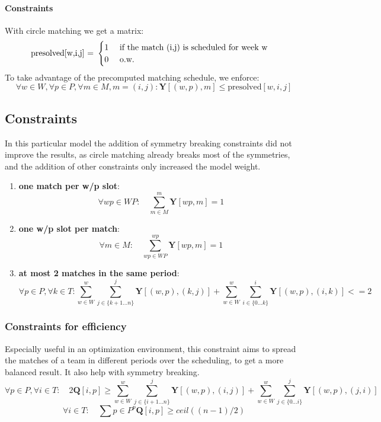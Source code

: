 \paragraph{Constraints}
With circle matching we get a matrix:
\[
\text{presolved[w,i,j] = }
\begin{cases}
    \text{1 \quad if the match (i,j) is scheduled for week w}\\
    \text{0 \quad o.w.}
\end{cases}
\]
To take advantage of the precomputed matching schedule, we enforce:
\[\forall w \in W, \forall p \in P, \forall m \in M, m = (i,j): \textbf{Y}[(w,p),m] \leq \text{presolved}[w,i,j]\]


\subsection{Constraints}
In this particular model the addition of symmetry breaking constraints did not improve the results, as circle matching already breaks most of the symmetries, and the addition of other constraints only increased the model weight.

\begin{enumerate}
\item \textbf{one match per w/p slot}: 
\[\forall wp \in WP: \quad\sum_{m \in M}^{m} \textbf{Y}[wp, m] = 1\]
\item \textbf{one w/p slot per match}: 
\[\forall m \in M: \quad\sum_{wp \in WP}^{wp} \textbf{Y}[wp, m] = 1\]
\item \textbf{at most 2 matches in the same period}: 
\[
\forall p \in P, \forall k \in T:
\sum_{w \in W}^{w}\sum_{j \in \{k+1\dots n\}}^{j} \textbf{Y}[(w,p), (k,j)] + 
\sum_{w \in W}^{w}\sum_{i \in \{0\dots k\}}^{i} \textbf{Y}[(w,p), (i,k)] <= 2
\]
\end{enumerate}

\subsubsection*{Constraints for efficiency}
Especially useful in an optimization environment, this constraint aims to spread the matches of a team in different periods over the scheduling, to get a more balanced result. It also help with symmetry breaking.
\[
    \forall p \in P, \forall i \in T: \quad 2 \textbf{Q}[i,p] \geq 
    \sum_{w \in W}^{w}\sum_{j \in \{i+1\dots n\}}^{j} \textbf{Y}[(w,p), (i,j)] + 
    \sum_{w \in W}^{w}\sum_{j \in \{0\dots i\}}^{j} \textbf{Y}[(w,p), (j,i)]
\]
\[
    \forall i \in T: \quad \sum{p \in P}^p \textbf{Q}[i,p] \geq ceil((n-1)/2)
\]

